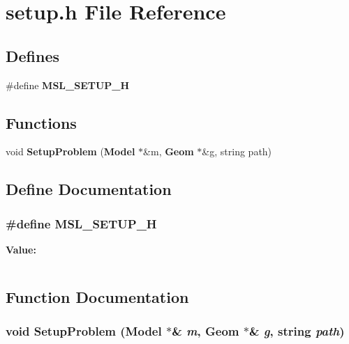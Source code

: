 \section{setup.h File Reference}
\label{setup_8h}
\subsection*{Defines}
\begin{CompactItemize}
\item 
\#define {\bf MSL\_\-SETUP\_\-H}
\end{CompactItemize}
\subsection*{Functions}
\begin{CompactItemize}
\item 
void {\bf Setup\-Problem} ({\bf Model} $\ast$\&m, {\bf Geom} $\ast$\&g, string path)
\end{CompactItemize}


\subsection{Define Documentation}
\subsubsection{\setlength{\rightskip}{0pt plus 5cm}\#define MSL\_\-SETUP\_\-H}\label{setup_8h_a0}


{\bf Value:}\footnotesize\begin{verbatim}
\end{verbatim}\normalsize 


\subsection{Function Documentation}
\subsubsection{\setlength{\rightskip}{0pt plus 5cm}void Setup\-Problem ({\bf Model} $\ast$\& {\em m}, {\bf Geom} $\ast$\& {\em g}, string {\em path})}\label{setup_8h_a1}


